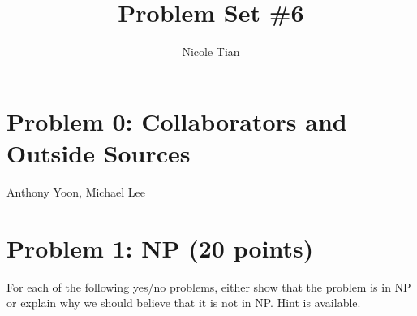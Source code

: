 \documentclass[12pt]{article}
\title{Problem Set \#6}
\author{Nicole Tian}
\begin{document}
\maketitle                  %
\thispagestyle{empty}       %


\section*{Problem 0: Collaborators and Outside Sources}
Anthony Yoon, Michael Lee

\section*{Problem 1: NP (20 points)}
For each of the following yes/no problems, either show that the problem is in NP or explain why we should believe that it is not in NP. Hint is available.
\end{document}
